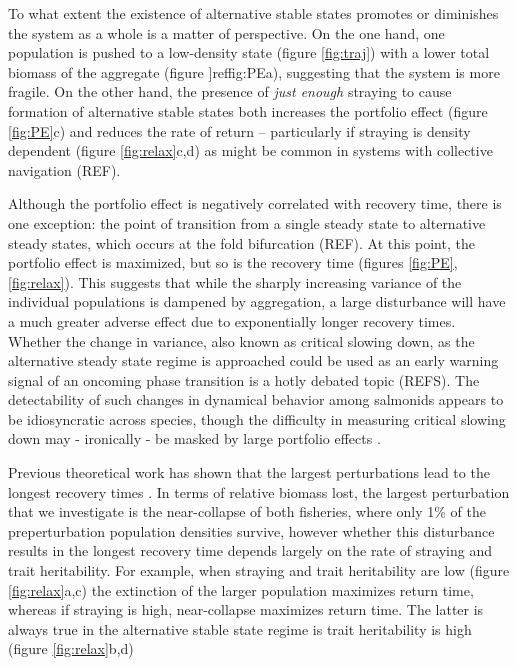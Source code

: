 \documentclass[twocolumn,preprintnumbers,amsmath,amssymb,superscriptaddress]{revtex4}
\begin{document}
To what extent the existence of alternative stable states promotes or diminishes the system as a whole is a matter of perspective.
On the one hand, one population is pushed to a low-density state (figure \ref{fig:traj}) with a lower total biomass of the aggregate (figure ]ref{fig:PE}a), suggesting that the system is more fragile.
On the other hand, the presence of \emph{just enough} straying to cause formation of alternative stable states both increases the portfolio effect (figure \ref{fig:PE}c) and reduces the rate of return -- particularly if straying is density dependent (figure \ref{fig:relax}c,d) as might be common in systems with collective navigation (REF).

Although the portfolio effect is negatively correlated with recovery time, there is one exception: the point of transition from a single steady state to alternative steady states, which occurs at the fold bifurcation (REF).
At this point, the portfolio effect is maximized, but so is the recovery time (figures \ref{fig:PE}, \ref{fig:relax}).
This suggests that while the sharply increasing variance of the individual populations is dampened by aggregation, a large disturbance will have a much greater adverse effect due to exponentially longer recovery times.
Whether the change in variance, also known as critical slowing down, as the alternative steady state regime is approached could be used as an early warning signal of an oncoming phase transition is a hotly debated topic (REFS).
The detectability of such changes in dynamical behavior among salmonids appears to be idiosyncratic across species, though the difficulty in measuring critical slowing down may - ironically - be masked by large portfolio effects \cite{Krkosek:2014ch}.

Previous theoretical work has shown that the largest perturbations lead to the longest recovery times \cite{Ovaskainen:2002il}.
In terms of relative biomass lost, the largest perturbation that we investigate is the near-collapse of both fisheries, where only 1\% of the preperturbation population densities survive, however whether this disturbance results in the longest recovery time depends largely on the rate of straying and trait heritability.
For example, when straying and trait heritability are low (figure \ref{fig:relax}a,c) the extinction of the larger population maximizes return time, whereas if straying is high, near-collapse maximizes return time.
The latter is always true in the alternative stable state regime is trait heritability is high (figure \ref{fig:relax}b,d)
\end{document}
